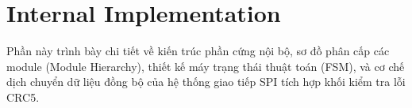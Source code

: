 



\section{Internal Implementation}

Phần này trình bày chi tiết về kiến trúc phần cứng nội bộ, sơ đồ phân cấp các module (Module Hierarchy), thiết kế máy trạng thái thuật toán (FSM), và cơ chế dịch chuyển dữ liệu đồng bộ của hệ thống giao tiếp SPI tích hợp khối kiểm tra lỗi CRC5.

